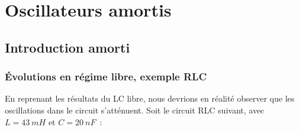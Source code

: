 \documentclass[../../main/main.tex]{subfiles}
\begin{document}
\vspace*{\fill}

\newpage

\section{Oscillateurs amortis}
\subsection{Introduction amorti}

\subsubsection{Évolutions en régime libre, exemple RLC}

\begin{minipage}{0.60\linewidth}
	En reprenant les résultats du LC libre, nous devrions en réalité observer que
	les oscillations dans le circuit s'atténuent. Soit le circuit RLC
	suivant, avec $L = \SI{43}{mH}$ et $C
		= \SI{20}{nF}$~:
\end{minipage}
\begin{minipage}{0.40\linewidth}
	\begin{center}
	\end{center}
\end{minipage}
\end{document}
